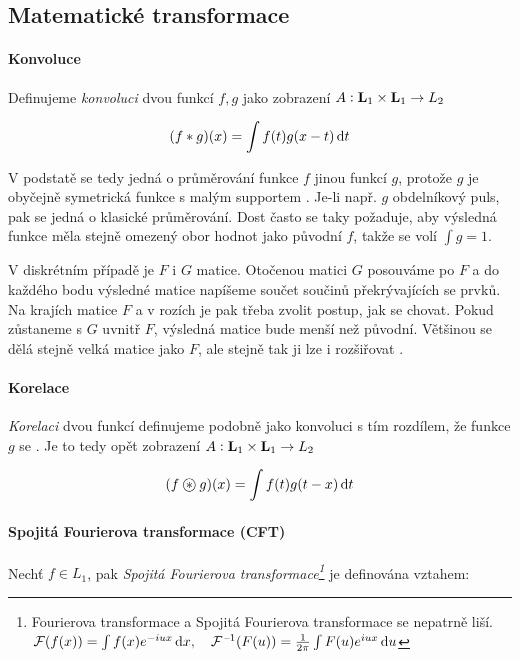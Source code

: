 \subsection{Matematické transformace}

\paragraph{Konvoluce}
Definujeme \emph{konvoluci} dvou funkcí $f,g$ jako zobrazení $A: \mathbf{L}_1\times\mathbf{L}_1\rightarrow L_2$

\begin{equation}
(f\conv g)(x)=\int f(t)g(x-t)\dif t
\end{equation}

V podstatě se tedy jedná o průměrování funkce $f$ jinou funkcí $g$, protože $g$ je obyčejně symetrická funkce s
malým supportem . Je-li např. $g$ obdelníkový puls, pak se jedná o klasické průměrování. Dost 
často se taky požaduje, aby výsledná funkce měla stejně omezený obor hodnot jako původní $f$, takže se volí $\int g=1$.

V diskrétním případě je $F$ i $G$ matice. Otočenou matici $G$ posouváme po $F$ a do každého bodu výsledné matice
napíšeme součet součinů překrývajících se prvků. Na krajích matice $F$ a v rozích je pak třeba zvolit postup, jak se chovat.
Pokud zůstaneme s $G$ uvnitř $F$, výsledná matice bude menší než původní. Většinou se dělá stejně velká matice jako $F$, ale
stejně tak ji lze i rozšiřovat .

\paragraph{Korelace}

\emph{Korelaci} dvou funkcí definujeme podobně jako konvoluci s tím rozdílem, že funkce $g$ se . Je to tedy opět zobrazení $A: \mathbf{L}_1\times\mathbf{L}_1\rightarrow L_2$

\begin{equation}
(f\corr g)(x)=\int f(t)g(t-x)\dif t
\end{equation}

\paragraph{Spojitá Fourierova transformace (CFT)}
Nechť $f\in L_1$, pak \emph{Spojitá Fourierova transformace\footnote{Fourierova transformace a Spojitá Fourierova transformace se
nepatrně liší.\\$\FT(f(x))=\int f(x)e^{-i u x}\dif x,\quad \IFT(F(u))=\frac{1}{2\pi}\int F(u)e^{i u x}\dif u$}} je definována vztahem:

